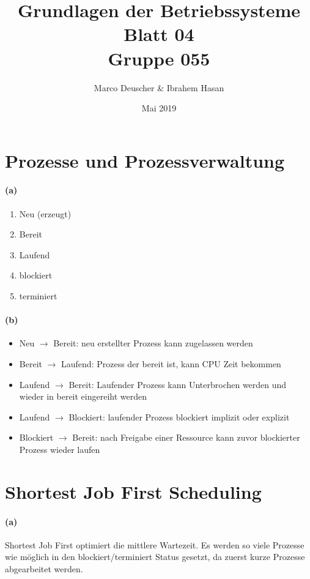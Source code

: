 \documentclass[a4paper]{article}
\title{Grundlagen der Betriebssysteme\\ Blatt 04 \\ Gruppe 055}
\author{Marco Deuscher & Ibrahem Hasan}
\date{Mai 2019}
\begin{document}
\maketitle

\section{Prozesse und Prozessverwaltung}
\paragraph{(a)}
\begin{enumerate}
    \item Neu (erzeugt)
    \item Bereit
    \item Laufend
    \item blockiert
    \item terminiert
\end{enumerate}

\paragraph{(b)}
\begin{itemize}
    \item Neu $\rightarrow$ Bereit: neu erstellter Prozess kann zugelassen werden
    \item Bereit $\rightarrow$ Laufend: Prozess der bereit ist, kann CPU Zeit bekommen
    \item Laufend $\rightarrow$ Bereit: Laufender Prozess kann Unterbrochen werden und wieder in bereit eingereiht werden
    \item Laufend $\rightarrow$ Blockiert: laufender Prozess blockiert implizit oder explizit
    \item Blockiert $\rightarrow$ Bereit: nach Freigabe einer Ressource kann zuvor blockierter Prozess wieder laufen
\end{itemize}

\section{Shortest Job First Scheduling}

\paragraph{(a)}
Shortest Job First optimiert die mittlere Wartezeit. Es werden so viele Prozesse wie möglich in den blockiert/terminiert Status gesetzt, da zuerst kurze Prozesse abgearbeitet werden.
\end{document}
